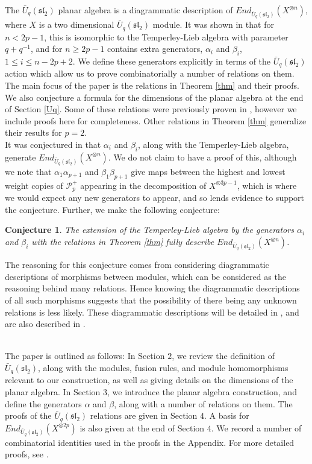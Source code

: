 \documentclass[]{article}
\newtheorem{conj}{Conjecture}[section]
\begin{document}
The $\bar{U}_{q}(\mathfrak{sl}_{2})$ planar algebra is a diagrammatic description of $End_{\bar{U}_{q}(\mathfrak{sl}_{2})}(X^{\otimes n})$, where $X$ is a two dimensional $\bar{U}_{q}(\mathfrak{sl}_{2})$ module. It was shown in \cite{GST} that for $n<2p-1$, this is isomorphic to the Temperley-Lieb algebra with parameter $q+q^{-1}$, and for $n\geq 2p-1$ contains extra generators, $\alpha_{i}$ and $\beta_{i}$, $1\leq i\leq n-2p+2$. We define these generators explicitly in terms of the $\bar{U}_{q}(\mathfrak{sl}_{2})$ action which allow us to prove combinatorially a number of relations on them. The main focus of the paper is the relations in Theorem \ref{thm} and their proofs. We also conjecture a formula for the dimensions of the planar algebra at the end of Section \ref{Uq}. Some of these relations were previously proven in \cite{GST}, however we include proofs here for completeness. Other relations in Theorem \ref{thm} generalize their results for $p=2$.\\

It was conjectured in \cite{GST} that $\alpha_{i}$ and $\beta_{i}$, along with the Temperley-Lieb algebra, generate $End_{\bar{U}_{q}(\mathfrak{sl}_{2})}(X^{\otimes n})$. We do not claim to have a proof of this, although we note that $\alpha_{1}\alpha_{p+1}$ and $\beta_{1}\beta_{p+1}$ give maps between the highest and lowest weight copies of $\mathcal{P}^{+}_{p}$ appearing in the decomposition of $X^{\otimes 3p-1}$, which is where we would expect any new generators to appear, and so lends evidence to support the conjecture. Further, we make the following conjecture:
\begin{conj}
The extension of the Temperley-Lieb algebra by the generators $\alpha_{i}$ and $\beta_{i}$ with the relations in Theorem \ref{thm} fully describe $End_{\bar{U}_{q}(\mathfrak{sl}_{2})}(X^{\otimes n})$.	
\end{conj}
The reasoning for this conjecture comes from considering diagrammatic descriptions of morphisms between modules, which can be considered as the reasoning behind many relations. Hence knowing the diagrammatic descriptions of all such morphisms suggests that the possibility of there being any unknown relations is less likely. These diagrammatic descriptions will be detailed in \cite{Me2}, and are also described in \cite{MeThesis}.\\\

The paper is outlined as follows: In Section $2$, we review the definition of $\bar{U}_{q}(\mathfrak{sl}_{2})$, along with the modules, fusion rules, and module homomorphisms relevant to our construction, as well as giving details on the dimensions of the planar algebra. In Section $3$, we introduce the planar algebra construction, and define the generators $\alpha$ and $\beta$, along with a number of relations on them. The proofs of the $\bar{U}_{q}(\mathfrak{sl}_{2})$ relations are given in Section $4$. A basis for $End_{\bar{U}_{q}(\mathfrak{sl}_{2})}(X^{\otimes 2p})$ is also given at the end of Section $4$. We record a number of combinatorial identities used in the proofs in the Appendix. For more detailed proofs, see \cite{MeThesis}.
\end{document}
